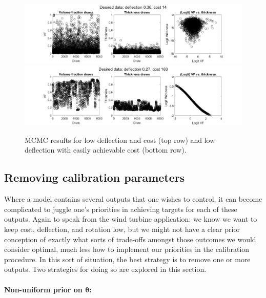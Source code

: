 \documentclass{article}
\begin{document}
\begin{figure}
\centering
\includegraphics[width=.9\linewidth]{FIG1_posterior_samps_at_spec_cost}
\includegraphics[width=.9\linewidth]{FIG2_posterior_samps_at_spec_cost}
\captionsetup{width=.9\linewidth}
\caption{MCMC results for low deflection and cost (top row) and low deflection with easily achievable cost (bottom row).}
\label{fig:des_data}
\end{figure}

\subsection{Removing calibration parameters}\label{removing_cal_pars}


Where a model contains several outputs that one wishes to control, it can become complicated to juggle one's priorities in achieving targets for each of these outputs. Again to speak from the wind turbine application: we know we want to keep cost, deflection, and rotation low, but we might not have a clear prior conception of exactly what sorts of trade-offs amongst those outcomes we would consider optimal, much less how to implement our priorities in the calibration procedure. In this sort of situation, the best strategy is to remove one or more outputs. Two strategies for doing so are explored in this section.

\paragraph{Non-uniform prior on $\boldsymbol \theta$:}\label{non-uniform_prior}
\end{document}
